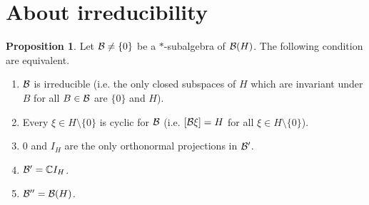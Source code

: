 \documentclass[10pt,english,a4paper]{article}
\theoremstyle{definition}
\newtheorem*{proposition}{Proposition}
\begin{document}
\section{About irreducibility}
\begin{proposition}
    Let $\mathcal{B}\neq \{0\}$ be a $*$-subalgebra of $\mathcal{B}(H)$.
The following condition are equivalent. 
\begin{enumerate}[(1)]
    \item $\mathcal{B}$ is irreducible (i.e. the only closed subspaces of $H$ which are invariant under 
$B$ for all $B\in \mathcal{B}$ are $\{0\}$ and $H$).

\item Every $\xi \in H\setminus \{0\}$ is cyclic for $\mathcal{B}$ (i.e. $[\mathcal{B}\xi] = H$ for all $\xi \in H\setminus \{0\}$).

\item $0$ and $I_H$ are the only orthonormal projections in $\mathcal{B}'$.

\item $\mathcal{B}' = \mathbb{C} I_H$.
\item $\mathcal{B}'' = \mathcal{B}(H)$.
\end{enumerate}

\end{proposition}
\end{document}
